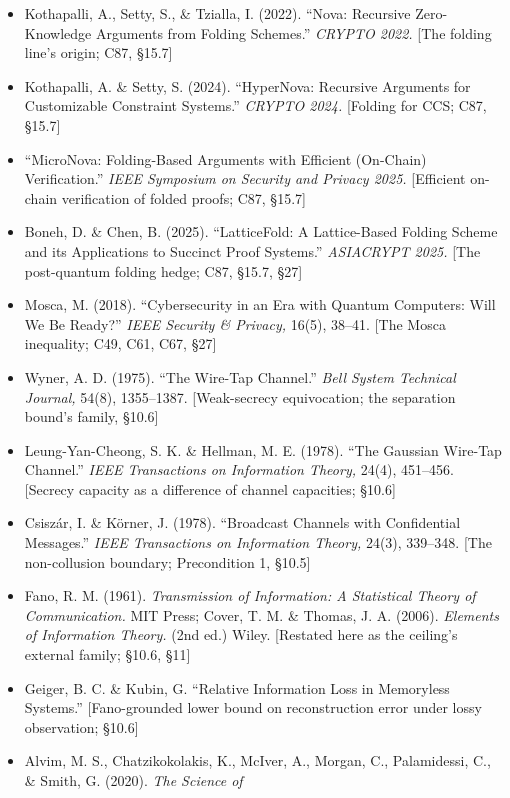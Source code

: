 \documentclass[
  11pt,
]{article}
\begin{document}
\begin{itemize}
\item
  Kothapalli, A., Setty, S., \& Tzialla, I. (2022). ``Nova: Recursive
  Zero-Knowledge Arguments from Folding Schemes.'' \emph{CRYPTO 2022.}
  {[}The folding line's origin; C87, §15.7{]}
\item
  Kothapalli, A. \& Setty, S. (2024). ``HyperNova: Recursive Arguments
  for Customizable Constraint Systems.'' \emph{CRYPTO 2024.} {[}Folding
  for CCS; C87, §15.7{]}
\item
  ``MicroNova: Folding-Based Arguments with Efficient (On-Chain)
  Verification.'' \emph{IEEE Symposium on Security and Privacy 2025.}
  {[}Efficient on-chain verification of folded proofs; C87, §15.7{]}
\item
  Boneh, D. \& Chen, B. (2025). ``LatticeFold: A Lattice-Based Folding
  Scheme and its Applications to Succinct Proof Systems.''
  \emph{ASIACRYPT 2025.} {[}The post-quantum folding hedge; C87, §15.7,
  §27{]}
\item
  Mosca, M. (2018). ``Cybersecurity in an Era with Quantum Computers:
  Will We Be Ready?'' \emph{IEEE Security \& Privacy,} 16(5), 38--41.
  {[}The Mosca inequality; C49, C61, C67, §27{]}
\item
  Wyner, A. D. (1975). ``The Wire-Tap Channel.'' \emph{Bell System
  Technical Journal,} 54(8), 1355--1387. {[}Weak-secrecy equivocation;
  the separation bound's family, §10.6{]}
\item
  Leung-Yan-Cheong, S. K. \& Hellman, M. E. (1978). ``The Gaussian
  Wire-Tap Channel.'' \emph{IEEE Transactions on Information Theory,}
  24(4), 451--456. {[}Secrecy capacity as a difference of channel
  capacities; §10.6{]}
\item
  Csiszár, I. \& Körner, J. (1978). ``Broadcast Channels with
  Confidential Messages.'' \emph{IEEE Transactions on Information
  Theory,} 24(3), 339--348. {[}The non-collusion boundary; Precondition
  1, §10.5{]}
\item
  Fano, R. M. (1961). \emph{Transmission of Information: A Statistical
  Theory of Communication.} MIT Press; Cover, T. M. \& Thomas, J. A.
  (2006). \emph{Elements of Information Theory.} (2nd ed.) Wiley.
  {[}Restated here as the ceiling's external family; §10.6, §11{]}
\item
  Geiger, B. C. \& Kubin, G. ``Relative Information Loss in Memoryless
  Systems.'' {[}Fano-grounded lower bound on reconstruction error under
  lossy observation; §10.6{]}
\item
  Alvim, M. S., Chatzikokolakis, K., McIver, A., Morgan, C.,
  Palamidessi, C., \& Smith, G. (2020). \emph{The Science of
}
\end{itemize}
\end{document}
